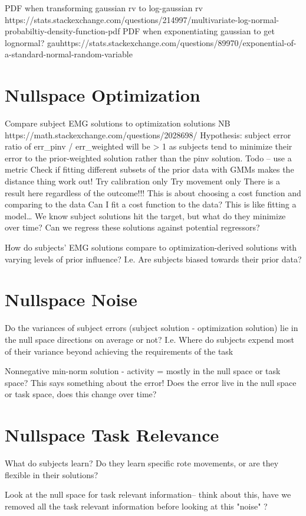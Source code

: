 \documentclass[../main.tex]{subfiles}
\begin{document}
PDF when transforming gaussian rv to log-gaussian rv https://stats.stackexchange.com/questions/214997/multivariate-log-normal-probabiltiy-density-function-pdf
PDF when exponentiating gaussian to get lognormal? gauhttps://stats.stackexchange.com/questions/89970/exponential-of-a-standard-normal-random-variable


\section[short]{Nullspace Optimization}

Compare subject EMG solutions to optimization solutions
NB https://math.stackexchange.com/questions/2028698/
Hypothesis: subject error ratio of err_pinv / err_weighted will be > 1 as subjects tend to minimize their error to the prior-weighted solution rather than the pinv solution.
Todo – use a metric
Check if fitting different subsets of the prior data with GMMs makes the distance thing work out! 
Try calibration only
Try movement only
There is a result here regardless of the outcome!!!
This is about choosing a cost function and comparing to the data
Can I fit a cost function to the data? This is like fitting a model… 
We know subject solutions hit the target, but what do they minimize over time?
Can we regress these solutions against potential regressors?

How do subjects’ EMG solutions compare to optimization-derived solutions with varying levels of prior influence? I.e. Are subjects biased towards their prior data?

\section[short]{Nullspace Noise}

Do the variances of subject errors (subject solution - optimization solution) lie in the null space directions on average or not? I.e. Where do subjects expend most of their variance beyond achieving the requirements of the task 

Nonnegative min-norm solution - activity = mostly in the null space or task space? This says something about the error! Does the error live in the null space or task space, does this change over time?

\section[short]{Nullspace Task Relevance}

What do subjects learn? Do they learn specific rote movements, or are they flexible in their solutions?

Look at the null space for task relevant information-- think about this, have we removed all the task relevant information before looking at this "noise" ? 


\end{document}
